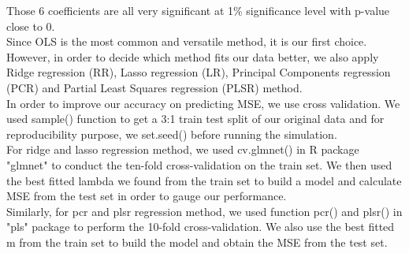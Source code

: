 \documentclass{article}
\begin{document}
Those 6 coefficients are all very significant at 1\% significance level with p-value close to 0.\\

Since OLS is the most common and versatile method, it is our first choice. However, in order to decide which method fits our data better, we also apply Ridge regression (RR), Lasso regression (LR), Principal Components regression (PCR) and Partial Least Squares regression (PLSR) method.\\

In order to improve our accuracy on predicting MSE, we use cross validation. We used sample() function to get a 3:1 train test split of our original data and for reproducibility purpose, we set.seed() before running the simulation.\\

For ridge and lasso regression method, we used cv.glmnet() in R package "glmnet" to conduct the ten-fold cross-validation on the train set. We then used the best fitted lambda we found from the train set to build a model and calculate MSE from the test set in order to gauge our performance.\\

Similarly, for pcr and plsr regression method, we used function pcr() and plsr() in "pls" package to perform the 10-fold cross-validation. We also use the best fitted m from the train set to build the model and obtain the MSE from the test set.\\
\end{document}
